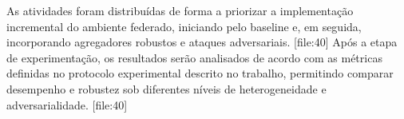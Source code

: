 As atividades foram distribuídas de forma a priorizar a implementação incremental do ambiente federado, iniciando pelo baseline e, em seguida, incorporando agregadores robustos e ataques adversariais. [file:40]
Após a etapa de experimentação, os resultados serão analisados de acordo com as métricas definidas no protocolo experimental descrito no trabalho, permitindo comparar desempenho e robustez sob diferentes níveis de heterogeneidade e adversarialidade. [file:40]




%
%
%     
%
%
